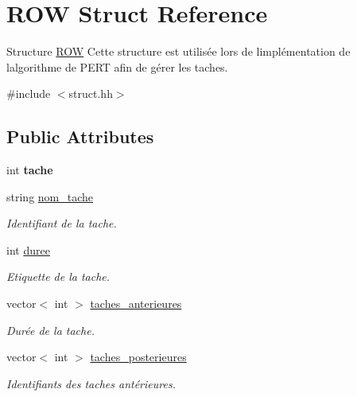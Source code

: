 \hypertarget{structROW}{}\section{R\+OW Struct Reference}
\label{structROW}


Structure \hyperlink{structROW}{R\+OW} Cette structure est utilis\'{e}e lors de l\textquotesingle{}impl\'{e}mentation de l\textquotesingle{}algorithme de P\+E\+RT afin de g\'{e}rer les taches.  




{\ttfamily \#include $<$struct.\+hh$>$}

\subsection*{Public Attributes}
\begin{DoxyCompactItemize}
\item 
\mbox{\label{structROW_ac5fd13379e0bf8dbc4c7b4c08d146d03}} 
int {\bfseries tache}
\item 
\mbox{\label{structROW_abef8dce3e6f2304fc6d054cd72049d3c}} 
string \hyperlink{structROW_abef8dce3e6f2304fc6d054cd72049d3c}{nom\+\_\+tache}
\begin{DoxyCompactList}\small\item\em Identifiant de la tache. \end{DoxyCompactList}\item 
\mbox{\label{structROW_a08fa02b531da6e635ff63354741dad25}} 
int \hyperlink{structROW_a08fa02b531da6e635ff63354741dad25}{duree}
\begin{DoxyCompactList}\small\item\em Etiquette de la tache. \end{DoxyCompactList}\item 
\mbox{\label{structROW_a549beed8021a06953d4714793d16378c}} 
vector$<$ int $>$ \hyperlink{structROW_a549beed8021a06953d4714793d16378c}{taches\+\_\+anterieures}
\begin{DoxyCompactList}\small\item\em Dur\'{e}e de la tache. \end{DoxyCompactList}\item 
\mbox{\label{structROW_a2400c1eb97bfbc9c0aa22404fd63a7b1}} 
vector$<$ int $>$ \hyperlink{structROW_a2400c1eb97bfbc9c0aa22404fd63a7b1}{taches\+\_\+posterieures}
\begin{DoxyCompactList}\small\item\em Identifiants des taches ant\'{e}rieures. \end{DoxyCompactList}\end{DoxyCompactItemize}


